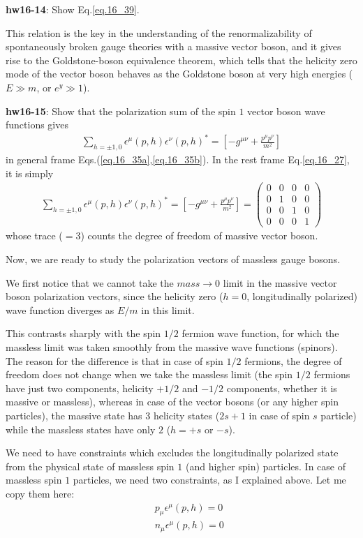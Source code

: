 \documentclass[12pt]{article}
\def\eps{\epsilon}
\begin{document}
{\bf hw16-14}:  Show Eq.\ref{eq.16_39}.

This relation is the key in the understanding of the renormalizability
of spontaneously broken gauge theories with a massive vector boson,
and it gives rise to the Goldstone-boson equivalence theorem, which
tells that the helicity zero mode of the vector boson behaves as
the Goldstone boson at very high energies ($E \gg m$, or $e^y \gg 1$).

{\bf hw16-15}: Show that the polarization sum of the spin $1$ vector boson
wave functions gives
\begin{eqnarray}
  \sum_{h=\pm1,0} \eps^\mu(p,h) \eps^\nu(p,h)^*
= [ -g^{\mu\nu} + \frac{p^\mu p^\nu}{m^2} ] \label{eq.16_40}
\end{eqnarray}
in general frame Eqs.(\ref{eq.16_35a},\ref{eq.16_35b}). In the rest frame Eq.\ref{eq.16_27}, it is simply
\begin{eqnarray}
  \sum_{h=\pm1,0} \eps^\mu(p,h) \eps^\nu(p,h)^*
= [ -g^{\mu\nu} + \frac{p^\mu p^\nu}{m^2} ]=
\begin{pmatrix}
  0 & 0 & 0 & 0 \\
  0 & 1 & 0 & 0 \\
  0 & 0 & 1 & 0 \\
  0 & 0 & 0 & 1
\end{pmatrix} \label{eq.16_41}
\end{eqnarray}
whose trace ($=3$) counts the degree of freedom of massive vector boson.

Now, we are ready to study the polarization vectors of massless gauge
bosons.

We first notice that we cannot take the $mass \to 0$ limit in the massive
vector boson polarization vectors, since the helicity zero ($h=0$,
longitudinally polarized) wave function diverges as $E/m$ in this limit.

This contrasts sharply with the spin $1/2$ fermion wave function, for
which the massless limit was taken smoothly from the massive wave
functions (spinors). The reason for the difference is that in case
of spin $1/2$ fermions, the degree of freedom does not change when we
take the massless limit (the spin $1/2$ fermions have just two components,
helicity $+1/2$ and $-1/2$ components, whether it is massive or massless),
whereas in case of the vector bosons (or any higher spin particles),
the massive state has $3$ helicity states ($2s+1$ in case of spin $s$
particle) while the massless states have only $2$ ($h = +s$ or $-s$).

We need to have constraints which excludes the longitudinally polarized
state from the physical state of massless spin $1$ (and higher spin)
particles. In case of massless spin $1$ particles, we need two
constraints, as I explained above.  Let me copy them here:
\begin{eqnarray}
&& p_\mu \eps^\mu(p,h) = 0 \label{eq.16_42a}\\ 
&& n_\mu \eps^\mu(p,h) = 0 \label{eq.16_42b}
\end{eqnarray}
\end{document}
